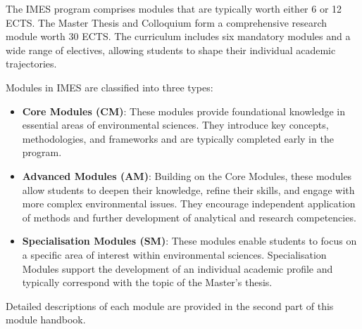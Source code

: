 \documentclass[
  letterpaper,
  10pt,
  openany]{book}
\begin{document}

The IMES program comprises modules that are typically worth either 6 or
12 ECTS. The Master Thesis and Colloquium form a comprehensive research
module worth 30 ECTS. The curriculum includes six mandatory modules and
a wide range of electives, allowing students to shape their individual
academic trajectories.

Modules in IMES are classified into three types:

\begin{itemize}
\item
  \textbf{Core Modules (CM)}: These modules provide foundational
  knowledge in essential areas of environmental sciences. They introduce
  key concepts, methodologies, and frameworks and are typically
  completed early in the program.
\item
  \textbf{Advanced Modules (AM)}: Building on the Core Modules, these
  modules allow students to deepen their knowledge, refine their skills,
  and engage with more complex environmental issues. They encourage
  independent application of methods and further development of
  analytical and research competencies.
\item
  \textbf{Specialisation Modules (SM)}: These modules enable students to
  focus on a specific area of interest within environmental sciences.
  Specialisation Modules support the development of an individual
  academic profile and typically correspond with the topic of the
  Master's thesis.
\end{itemize}

Detailed descriptions of each module are provided in the second part of
this module handbook.
\end{document}
